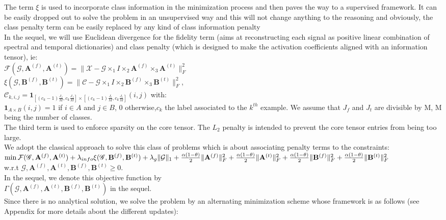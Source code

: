 \documentclass{article}
\def\tX{\boldsymbol{{\mathscr X}}}
\def\tG{\boldsymbol{{\mathscr G}}}
\def\tC{\boldsymbol{{\mathscr C}}}
\def\A{{\mathbf A}}
\def\B{{\mathbf B}}
\begin{document}
The term $\xi$ is used to incorporate class information in the minimization process and then paves the way to a supervised framework. It can be easily dropped out to solve the problem in an unsupervised way and this will not change anything to the reasoning and obviously, the class penalty term can be easily replaced by any kind of class information penalty\cite{ExampleofSupervisedTucker}\\
In the sequel, we will use Euclidean divergence for the fidelity term (aims at reconstructing each signal as positive linear combination of spectral and temporal dictionaries) and class penalty (which is designed to make the activation coefficients aligned with an information tensor), ie:\\
$\mathcal{F}(\tG,\A^{(f)},\A^{(t)})=\|\tX -\tG\times_{1}I\times_{2}\A^{(f)}\times_{3}\A^{(t)}\|^{2}_{F}$
\\
$\xi(\tG,\B^{(f)},\B^{(t)})=\| \tC - \tG \times_1 I \times_2 \B^{(f)} \times_3 \B^{(t)} \|_{F}^2$,
\\
$\tC_{k,i,j}=\mathbf{1}_{[(c_{k}-1)\frac{J_{f}}{M},c_{k}\frac{J_{f}}{M}]\times [(c_{k}-1)\frac{J_{t}}{M},c_{k}\frac{J_{t}}{M}]}(i,j)$ with:
\\
$\mathbf{1}_{A\times B}(i,j)=1$ if $i\in A$ and $j\in B$, 0 otherwise,$c_{k}$ the label associated to the $k^{th}$ example. We assume that $J_{f}$ and $J_{t}$ are divisible by M, M being the number of classes.\\
The third term is used to enforce sparsity on the core tensor. The $L_{2}$ penalty is intended to prevent the core tensor entries from being too large.\\
We adopt the classical approach to solve this class of problems which is about associating penalty terms to the constraints:\\
$\min \mathcal{F}(\tG,\A^{(f)},\A^{(t)}) +\lambda_{info}\xi(\tG,\B^{(f)},\B^{(t)})  +\lambda_{g}\|\mathcal{G}\|_{1}+\frac{\alpha(1-\theta)}{2}\|\A^{(f)}\|^{2}_{F}+\frac{\alpha(1-\theta)}{2}\|\A^{(t)}\|^{2}_{F}+\frac{\alpha(1-\theta)}{2}\|\B^{(f)}\|^{2}_{F}+\\\frac{\alpha(1-\theta)}{2}\|\B^{(t)}\|^{2}_{F}$\\
w.r.t $\tG,\A^{(f)},\A^{(t)},\B^{(f)} ,\B^{(t)}\geq 0$.\\
In the sequel, we denote this objective function by\\ $\Gamma(\tG,\A^{(f)},\A^{(t)},\B^{(f)},\B^{(t)})$ in the sequel.\\
Since there is no analytical solution, we solve the problem by an alternating minimization scheme whose framework is as follows (see Appendix for more details about the different updates):
\end{document}
